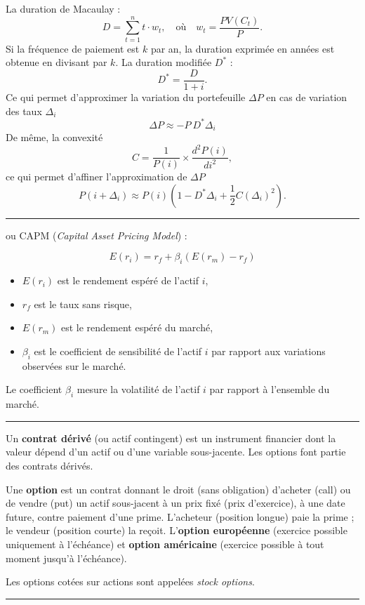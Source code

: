 \begin{f}

La duration de Macaulay :
\[ 		
D = \sum_{t=1}^{n} t \cdot w_t, \quad \text{où} \quad w_t = \frac{PV(C_t)}{P}.
 \]	
Si la fréquence de paiement est \(k\) par an, la duration exprimée en années est obtenue en divisant par \(k\).
La duration modifiée \(D^*\)  :
\[ 	
D^* = \frac{D}{1 + i}.
 \]
 Ce qui permet d'approximer la variation du portefeuille \(\Delta P\) en cas de variation des taux \(\Delta_i\)
\[ 
\Delta P \approx -P\ D^* \Delta_i 
 \]
De même, la convexité
\[ 	
C = \frac{1}{P(i)} \times \frac{d^2 P(i)}{di^2},
 \]
 ce qui permet d’affiner l'approximation de \(\Delta P\)
\[ 	
P(i + \Delta_i) \approx P(i) \left( 1 -D^*\Delta_i + \frac{1}{2} C (\Delta_i)^2 \right).
 \]
\end{f}
\hrule



\begin{f}[MEDAF]
  ou CAPM (\textit{Capital Asset Pricing Model})  :

\[
E(r_i) = r_f + \beta_i (E(r_m) - r_f)
\]

\begin{itemize}
    \item \( E(r_i) \) est le rendement espéré de l'actif \( i \),
    \item \( r_f \) est le taux sans risque,
    \item \( E(r_m) \) est le rendement espéré du marché,
    \item \( \beta_i \) est le coefficient de sensibilité de l'actif \( i \) par rapport aux variations observées sur le marché.
\end{itemize}

Le coefficient \( \beta_i \) mesure la volatilité de l'actif \( i \) par rapport à l'ensemble du marché. 

\end{f}
\hrule


\begin{f}

Un \textbf{contrat dérivé} (ou actif contingent) est un instrument financier dont la valeur dépend d’un actif ou d’une variable sous-jacente. Les options font partie des contrats dérivés.


Une \textbf{option} est un contrat donnant le droit (sans obligation) d’acheter (call) ou de vendre (put) un actif sous-jacent à un prix fixé (prix d’exercice), à une date future, contre paiement d’une prime. 
L’acheteur (position longue) paie la prime ; le vendeur (position courte) la reçoit.
L'\textbf{option européenne}  (exercice possible uniquement à l’échéance) et   
 \textbf{option américaine} (exercice possible à tout moment jusqu’à l’échéance).

Les options cotées sur actions sont appelées \textit{stock options}.

\end{f}
\hrule


